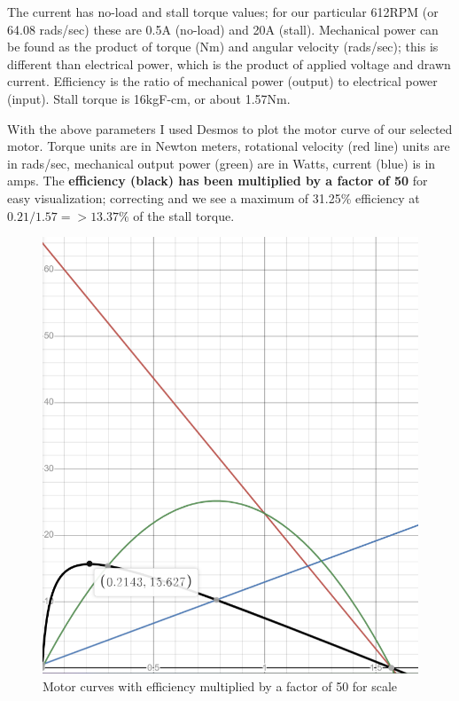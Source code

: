\documentclass[a4paper, 10pt]{article}
\begin{document}
		The current has no-load and stall torque values; for our particular 612RPM (or 64.08 rads/sec) these are 0.5A (no-load) and 20A (stall). Mechanical power can be found as the product of torque (Nm) and angular velocity (rads/sec); this is different than electrical power, which is the product of applied voltage and drawn current. Efficiency is the ratio of mechanical power (output) to electrical power (input). Stall torque is 16kgF-cm, or about 1.57Nm.
		
		With the above parameters I used Desmos to plot the motor curve of our selected motor. Torque units are in Newton meters, rotational velocity (red line) units are in rads/sec, mechanical output power (green) are in Watts, current (blue) is in amps. The \textbf{efficiency (black) has been multiplied by a factor of 50} for easy visualization; correcting and we see a maximum of 31.25\% efficiency at $ 0.21/1.57 => 13.37\% $ of the stall torque.
		
		\begin{figure} [!h]
			\centering
			\includegraphics[scale=0.5]{Photos/motor_curves_612}
			\caption{Motor curves with efficiency multiplied by a factor of 50 for scale}
			\label{motor_curves_612}
		\end{figure}
		
\end{document}

